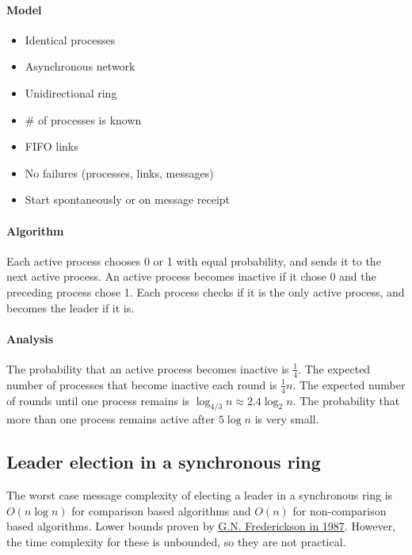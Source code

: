 \documentclass{idc_msc}
\begin{document}
\paragraph{Model}

\begin{itemize}
  \item Identical processes
  \item Asynchronous network
  \item Unidirectional ring
  \item \# of processes is known
  \item FIFO links
  \item No failures (processes, links, messages)
  \item Start spontaneously or on message receipt
\end{itemize}

\paragraph{Algorithm}
Each active process chooses 0 or 1 with equal probability, and sends it to the next active process.
An active process becomes inactive if it chose 0 and the preceding process chose 1.
Each process checks if it is the only active process, and becomes the leader if it is.

\paragraph{Analysis}

The probability that an active process becomes inactive is $\frac{1}{4}$.
The expected number of processes that become inactive each round is $\frac{1}{4}n$.
The expected number of rounds until one process remains is $\log_{4/3}n \approx 2.4 \log_2 n$.
The probability that more than one process remains active after $5 \log n$ is very small.

\subsection{Leader election in a synchronous ring}
The worst case message complexity of electing a leader in a synchronous ring is $O(n \log n)$ for comparison based algorithms and $O(n)$ for non-comparison based algorithms.
Lower bounds proven by \href{http://citeseerx.ist.psu.edu/viewdoc/download?doi=10.1.1.20.2091&rep=rep1&type=pdf}{G.N. Frederickson in 1987}.
However, the time complexity for these is unbounded, so they are not practical.
\end{document}

